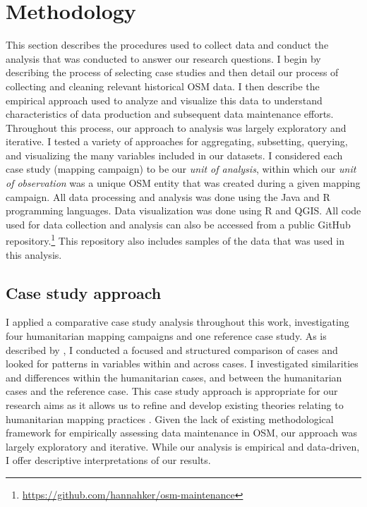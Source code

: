 \chapter{Methodology}
\label{chapterlabel4}

This section describes the procedures used to collect data and conduct the analysis that was conducted to answer our research questions. I begin by describing the process of selecting case studies and then detail our process of collecting and cleaning relevant historical OSM data. I then describe the empirical approach used to analyze and visualize this data to understand characteristics of data production and subsequent data maintenance efforts. Throughout this process, our approach to analysis was largely exploratory and iterative. I tested a variety of approaches for aggregating, subsetting, querying, and visualizing the many variables included in our datasets. I considered each case study (mapping campaign) to be our \textit{unit of analysis}, within which our \textit{unit of observation} was a unique OSM entity that was created during a given mapping campaign. All data processing and analysis was done using the Java and R programming languages. Data visualization was done using R and QGIS. All code used for data collection and analysis can also be accessed from a public GitHub repository.\footnote{\url{https://github.com/hannahker/osm-maintenance}} This repository also includes samples of the data that was used in this analysis. 

\section{Case study approach}

I applied a comparative case study analysis throughout this work, investigating four humanitarian mapping campaigns and one reference case study. As is described by \textcite{kaarbo_practical_1999}, I conducted a focused and structured comparison of cases and looked for patterns in variables within and across cases. I investigated similarities and differences within the humanitarian cases, and between the humanitarian cases and the reference case. This case study approach is appropriate for our research aims as it allows us to refine and develop existing theories relating to humanitarian mapping practices \parencite{kaarbo_practical_1999}. Given the lack of existing methodological framework for empirically assessing data maintenance in OSM, our approach was largely exploratory and iterative. While our analysis is empirical and data-driven, I offer descriptive interpretations of our results.

